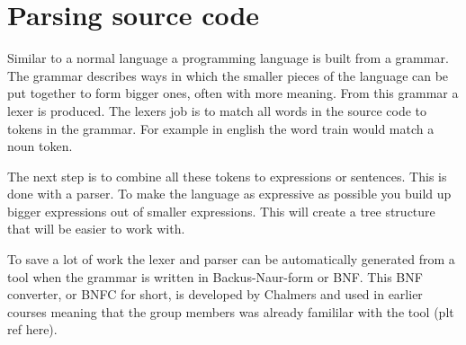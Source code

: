 \section{Parsing source code} \label{sec:bnfc}
Similar to a normal language a programming language is built from a grammar.
The grammar describes ways in which the smaller pieces of the language can be put
together to form bigger ones, often with more meaning.
From this grammar a lexer is produced. The lexers job is to match all words in the
source code to tokens in the grammar. For example in english the word train 
would match a noun token. 

The next step is to combine all these tokens to expressions or sentences. This
is done with a parser. To make the language as expressive as possible you build
up bigger expressions out of smaller expressions. This will create a tree
structure that will be easier to work with. 

To save a lot of work the lexer and parser can be automatically generated from
a tool when the grammar is written in Backus-Naur-form or BNF. This BNF converter, or
BNFC for short, is developed by Chalmers and used in earlier courses meaning that
the group members was already famililar with the tool (plt ref here).


